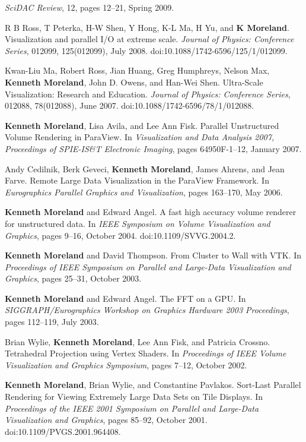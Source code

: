 \begin{enumerate}[label={[\arabic*]}, left=0pt]
  \emph{SciDAC Review}, 12, pages 12--21, Spring 2009.
\item  %
  R B Ross, T Peterka, H-W Shen, Y Hong, K-L Ma, H Yu, and \textbf{K Moreland}.
  Visualization and parallel {I/O} at extreme scale.
  \emph{Journal of Physics: Conference Series}, 012099, 125(012099), July 2008.
  doi:10.1088/1742-6596/125/1/012099.
\item  %
  Kwan-Liu Ma, Robert Ross, Jian Huang, Greg Humphreys, Nelson Max, \textbf{Kenneth Moreland}, John D. Owens, and Han-Wei Shen.
  Ultra-Scale Visualization: Research and Education.
  \emph{Journal of Physics: Conference Series}, 012088, 78(012088), June 2007.
  doi:10.1088/1742-6596/78/1/012088.
\item  %
  \textbf{Kenneth Moreland}, Lisa Avila, and Lee Ann Fisk.
  Parallel Unstructured Volume Rendering in ParaView.
  In \emph{Visualization and Data Analysis 2007, Proceedings of SPIE-IS\&T Electronic Imaging}, pages 64950F-1--12, January 2007.
\item  %
  Andy Cedilnik, Berk Geveci, \textbf{Kenneth Moreland}, James Ahrens, and Jean Farve.
  Remote Large Data Visualization in the {ParaView} Framework.
  In \emph{Eurographics Parallel Graphics and Visualization}, pages 163--170, May 2006.
\item  %
  \textbf{Kenneth Moreland} and Edward Angel.
  A fast high accuracy volume renderer for unstructured data.
  In \emph{IEEE Symposium on Volume Visualization and Graphics}, pages 9--16, October 2004.
  doi:10.1109/SVVG.2004.2.
\item  %
  \textbf{Kenneth Moreland} and David Thompson.
  From Cluster to Wall with {VTK}.
  In \emph{Proceedings of IEEE Symposium on Parallel and Large-Data Visualization and Graphics}, pages 25--31, October 2003.
\item  %
  \textbf{Kenneth Moreland} and Edward Angel.
  {The FFT on a GPU}.
  In \emph{SIGGRAPH/Eurographics Workshop on Graphics Hardware 2003 Proceedings}, pages 112--119, July 2003.
\item  %
  Brian Wylie, \textbf{Kenneth Moreland}, Lee Ann Fisk, and Patricia Crossno.
  Tetrahedral Projection using Vertex Shaders.
  In \emph{Proceedings of IEEE Volume Visualization and Graphics Symposium}, pages 7--12, October 2002.
\item  %
  \textbf{Kenneth Moreland}, Brian Wylie, and Constantine Pavlakos.
  Sort-Last Parallel Rendering for Viewing Extremely Large Data Sets on Tile Displays.
  In \emph{Proceedings of the IEEE 2001 Symposium on Parallel and Large-Data Visualization and Graphics}, pages 85--92, October 2001.
  doi:10.1109/PVGS.2001.964408.
\end{enumerate}